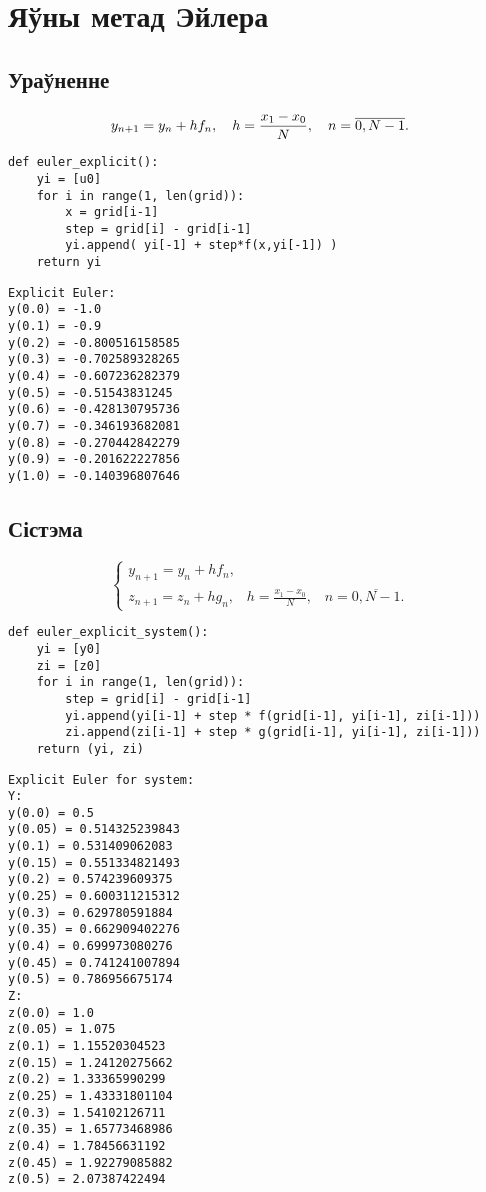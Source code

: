 \section{Яўны метад Эйлера}
\subsection*{Ураўненне}
\begin{equation}
    y_{n+1} = y_n + hf_n, \hspace{10pt} h = \frac{x_1-x_0}{N}, \hspace{10pt} n = \overline{0, N-1}. \\
\end{equation}

{\small
\begin{verbatim}
def euler_explicit():
    yi = [u0]
    for i in range(1, len(grid)):
        x = grid[i-1]
        step = grid[i] - grid[i-1]
        yi.append( yi[-1] + step*f(x,yi[-1]) )
    return yi
\end{verbatim}
}

{\small
\begin{verbatim}
Explicit Euler:
y(0.0) = -1.0
y(0.1) = -0.9
y(0.2) = -0.800516158585
y(0.3) = -0.702589328265
y(0.4) = -0.607236282379
y(0.5) = -0.51543831245
y(0.6) = -0.428130795736
y(0.7) = -0.346193682081
y(0.8) = -0.270442842279
y(0.9) = -0.201622227856
y(1.0) = -0.140396807646
\end{verbatim}
}

\subsection*{Сістэма}
\begin{equation}
	\begin{cases}
y_{n+1} = y_n + hf_n, \\
z_{n+1} = z_n + hg_n, \hspace{10pt} h = \frac{x_1-x_0}{N}, \hspace{10pt} n = \overline{0, N-1}.
	\end{cases}
\end{equation}

{\small
\begin{verbatim}
def euler_explicit_system():
    yi = [y0]
    zi = [z0]
    for i in range(1, len(grid)):
        step = grid[i] - grid[i-1]
        yi.append(yi[i-1] + step * f(grid[i-1], yi[i-1], zi[i-1]))
        zi.append(zi[i-1] + step * g(grid[i-1], yi[i-1], zi[i-1]))
    return (yi, zi)
\end{verbatim}
}

{\small
\begin{verbatim}
Explicit Euler for system:
Y:
y(0.0) = 0.5
y(0.05) = 0.514325239843
y(0.1) = 0.531409062083
y(0.15) = 0.551334821493
y(0.2) = 0.574239609375
y(0.25) = 0.600311215312
y(0.3) = 0.629780591884
y(0.35) = 0.662909402276
y(0.4) = 0.699973080276
y(0.45) = 0.741241007894
y(0.5) = 0.786956675174
Z:
z(0.0) = 1.0
z(0.05) = 1.075
z(0.1) = 1.15520304523
z(0.15) = 1.24120275662
z(0.2) = 1.33365990299
z(0.25) = 1.43331801104
z(0.3) = 1.54102126711
z(0.35) = 1.65773468986
z(0.4) = 1.78456631192
z(0.45) = 1.92279085882
z(0.5) = 2.07387422494
\end{verbatim}
}
